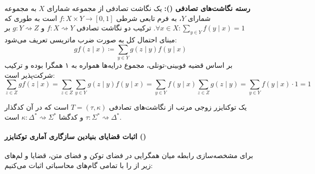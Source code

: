 \textbf{رسته نگاشت‌های تصادفی ():}
یک نگاشت تصادفی از مجموعه شمارای $X$ به مجموعه شمارای $Y$، به فرم تابعی شرطی $f: X \times Y \to [0, 1]$ است به طوری که $\forall x \in X: \sum_{y \in Y} f(y \mid x) = 1$. ترکیب دو نگاشت تصادفی $f: X \rightsquigarrow Y$ و $g: Y \rightsquigarrow Z$ بر مبنای احتمال کل به صورت ضرب ماتریسی تعریف می‌شود:
\begin{equation}
    gf(z \mid x) \coloneqq \sum_{y \in Y} g(z \mid y) f(y \mid x)
\end{equation}
بر اساس قضیه فوبینی-تونلی، مجموع درایه‌ها همواره به ۱ همگرا بوده و ترکیب شرکت‌پذیر است:
\begin{equation}
    \sum_{z \in Z} gf(z \mid x) = \sum_{z \in Z} \sum_{y \in Y} g(z \mid y) f(y \mid x) = \sum_{y \in Y} f(y \mid x) \sum_{z \in Z} g(z \mid y) = \sum_{y \in Y} f(y \mid x) \cdot 1 = 1
\end{equation}

یک توکنایزر زوجی مرتب از نگاشت‌های تصادفی $T = (\tau, \kappa)$ است که در آن کدگذار $\tau: \Sigma^* \rightsquigarrow \Delta^*$ و کدگشا $\kappa: \Delta^* \rightsquigarrow \Sigma^*$ است.

\paragraph*{اثبات قضایای بنیادین سازگاری آماری توکنایزر ()}
برای مشخصه‌سازی رابطه میان همگرایی در فضای توکن و فضای متن، قضایا و لم‌های زیر از \cite{gastaldi2025foundations} را با تمامی گام‌های محاسباتی اثبات می‌کنیم:

